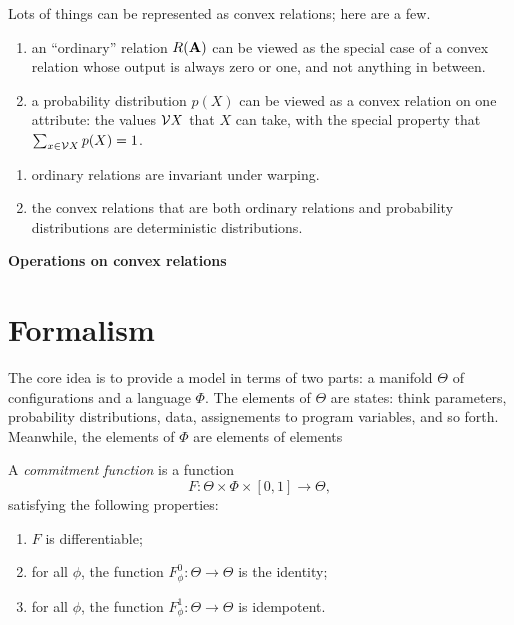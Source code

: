 \documentclass{article}
\begin{document}
    Lots of things can be represented as convex relations; here are a few. 
    \begin{enumerate}
        \item an ``ordinary'' relation $R(\mathbf{A})$
            can be viewed as the special case of a convex relation whose output is always zero or one, and not anything in between.
        \item a probability distribution $p(X)$ can be viewed as a convex relation on one attribute: the values $\mathcal V X$ that $X$ can take, with the special property that 
        $\sum_{x \in \mathcal V X}p(X) = 1$.
    \end{enumerate}
    
    \begin{remark}
        \begin{enumerate}
            \item ordinary relations are invariant under warping. 
            \item the convex relations that are both ordinary relations and probability distributions are deterministic distributions.
        \end{enumerate}
    \end{remark}
    
    \textbf{Operations on convex relations}
    
    \section{Formalism}
    The core idea is to provide a model in terms of two parts: a manifold $\Theta$
    of configurations and a language $\Phi$. 
    The elements of $\Theta$ are states: think parameters, probability distributions, data, assignements to program variables, and so forth.
    Meanwhile, the elements of $\Phi$ are elements of elements

    \begin{defn}
        A \emph{commitment function} is a function
        \[
            F: \Theta \times \Phi \times [0,1] \to \Theta,
        \]
        satisfying the following properties:
        \begin{enumerate}[nosep,label={CF\arabic*.}]
            \item $F$ is differentiable;
            \item for all $\phi$, the function $F^0_\phi : \Theta \to \Theta$ is the identity;
            \item for all $\phi$, the function $F^1_\phi : \Theta \to \Theta$ is idempotent.
        \end{enumerate}
    \end{defn}
    
\end{document}
